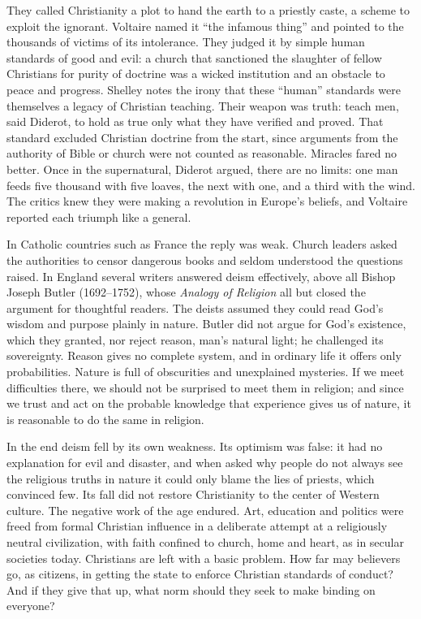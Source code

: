 They called Christianity a plot to hand the earth to a priestly caste, a scheme to exploit the
ignorant. Voltaire named it ``the infamous thing'' and pointed to the thousands of victims of its
intolerance. They judged it by simple human standards of good and evil: a church that sanctioned the
slaughter of fellow Christians for purity of doctrine was a wicked institution and an obstacle to
peace and progress. Shelley notes the irony that these ``human'' standards were themselves a legacy
of Christian teaching. Their weapon was truth: teach men, said Diderot, to hold as true only what
they have verified and proved. That standard excluded Christian doctrine from the start, since
arguments from the authority of Bible or church were not counted as reasonable. Miracles fared no
better. Once in the supernatural, Diderot argued, there are no limits: one man feeds five thousand
with five loaves, the next with one, and a third with the wind. The critics knew they were making a
revolution in Europe's beliefs, and Voltaire reported each triumph like a general.

In Catholic countries such as France the reply was weak. Church leaders asked the authorities to
censor dangerous books and seldom understood the questions raised. In England several writers
answered deism effectively, above all Bishop Joseph Butler (1692--1752), whose \emph{Analogy of
Religion} all but closed the argument for thoughtful readers. The deists assumed they could read God's
wisdom and purpose plainly in nature. Butler did not argue for God's existence, which they granted,
nor reject reason, man's natural light; he challenged its sovereignty. Reason gives no complete
system, and in ordinary life it offers only probabilities. Nature is full of obscurities and
unexplained mysteries. If we meet difficulties there, we should not be surprised to meet them in
religion; and since we trust and act on the probable knowledge that experience gives us of nature,
it is reasonable to do the same in religion.

In the end deism fell by its own weakness. Its optimism was false: it had no explanation for evil
and disaster, and when asked why people do not always see the religious truths in nature it could
only blame the lies of priests, which convinced few. Its fall did not restore Christianity to the
center of Western culture. The negative work of the age endured. Art, education and politics were
freed from formal Christian influence in a deliberate attempt at a religiously neutral civilization,
with faith confined to church, home and heart, as in secular societies today. Christians are left
with a basic problem. How far may believers go, as citizens, in getting the state to enforce
Christian standards of conduct? And if they give that up, what norm should they seek to make binding
on everyone?

